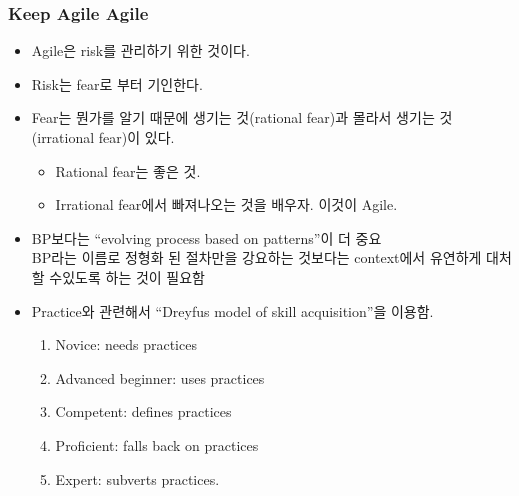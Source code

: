 \begin{frame}
\frametitle{Keep Agile Agile}

\begin{itemize}
\item Agile은 risk를 관리하기 위한 것이다.
\item Risk는 fear로 부터 기인한다.
\item Fear는 뭔가를 알기 때문에 생기는 것(rational fear)과 몰라서 생기는 
것(irrational fear)이 있다.
    \begin{itemize}
    \item Rational fear는 좋은 것.
    \item Irrational fear에서 빠져나오는 것을 배우자. 이것이 Agile.
    \end{itemize}
\item BP보다는 ``evolving process based on patterns''이 더 중요 \\
    BP라는 이름로 정형화 된 절차만을 강요하는 것보다는 context에서 
    유연하게 대처할 수있도록 하는 것이 필요함
\item Practice와 관련해서 ``Dreyfus model of skill acquisition''을 이용함.
    \begin{enumerate}
    \item Novice: needs practices
    \item Advanced beginner: uses practices
    \item Competent: defines practices
    \item Proficient: falls back on practices
    \item Expert: subverts practices.
    \end{enumerate}
\end{itemize}


\end{frame}
